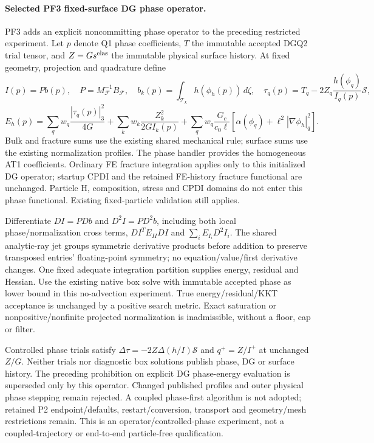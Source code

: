 \documentclass[11pt]{article}
\begin{document}
\paragraph{Selected PF3 fixed-surface DG phase operator.}
PF3 adds an explicit noncommitting phase operator to the preceding restricted
experiment. Let $p$ denote Q1 phase coefficients, $T$ the immutable accepted
DGQ2 trial tensor, and $Z=G s^{\rm elas}$ the immutable physical surface history.
At fixed geometry, projection and quadrature define
\[
 I(p)=P b(p),\quad P=M_{\mathcal F}^{-1}B_{\mathcal F},\quad
 b_k(p)=\int_{\mathcal T_k}h(\phi_h(p))\,d\zeta,\quad
 \tau_q(p)=T_q-2Z_q\frac{h(\phi_q)}{I_q(p)}\mathcal S,
\]
\[
 E_h(p)=\sum_q w_q\frac{|\tau_q(p)|_3^2}{4G}
 +\sum_k w_k\frac{Z_k^2}{2G I_k(p)}
 +\sum_q w_q\frac{G_c}{c_0\ell}
      \left[\alpha(\phi_q)+\ell^2|\nabla\phi_h|_q^2\right].
\]
Bulk and fracture sums use the existing shared mechanical rule; surface sums
use the existing normalization profiles. The phase handler provides the
homogeneous AT1 coefficients. Ordinary FE fracture integration applies only to
this initialized DG operator; startup CPDI and the retained FE-history fracture
functional are unchanged. Particle H, composition, stress and CPDI domains do
not enter this phase functional. Existing fixed-particle validation still applies.

Differentiate $DI=PDb$ and $D^2I=PD^2b$, including both local phase/normalization
cross terms, $DI^T E_{II}DI$ and $\sum_i E_{I_i}D^2I_i$. The shared analytic-ray
jet groups symmetric derivative products before addition to preserve transposed
entries' floating-point symmetry; no equation/value/first derivative changes.
One fixed adequate integration partition supplies energy, residual and Hessian.
Use the existing native box solve with immutable accepted phase as lower bound
in this no-advection experiment. True energy/residual/KKT acceptance is unchanged
by a positive search metric. Exact saturation or nonpositive/nonfinite projected
normalization is inadmissible, without a floor, cap or filter.

Controlled phase trials satisfy
$\Delta\tau=-2Z\Delta(h/I)\mathcal S$ and $q^+=Z/I^+$ at unchanged $Z/G$.
Neither trials nor diagnostic box solutions publish phase, DG or surface history.
The preceding prohibition on explicit DG phase-energy evaluation is superseded
only by this operator. Changed published profiles and outer physical phase
stepping remain rejected. A coupled phase-first algorithm is not adopted;
retained P2 endpoint/defaults, restart/conversion, transport and geometry/mesh
restrictions remain. This is an operator/controlled-phase experiment, not a
coupled-trajectory or end-to-end particle-free qualification.
\end{document}

